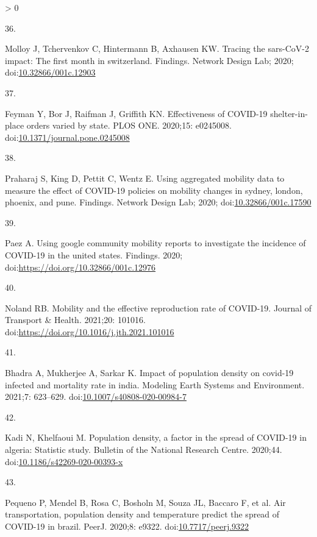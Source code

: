 \documentclass[10pt,letterpaper]{article}
\newlength{\csllabelwidth}
\newlength{\cslhangindent}
\newenvironment{CSLReferences}[3] %
 {%
  \setlength{\parindent}{0pt}
  \ifodd #1 \everypar{\setlength{\hangindent}{\cslhangindent}}\ignorespaces\fi
  \ifnum #2 > 0
  \setlength{\parskip}{#2\baselineskip}
  \fi
 }%
 {}
\newcommand{\CSLLeftMargin}[1]{\parbox[t]{\csllabelwidth}{#1}}
\newcommand{\CSLRightInline}[1]{\parbox[t]{\linewidth - \csllabelwidth}{#1}}
\begin{document}
\begin{CSLReferences}{0}{0}
\leavevmode\hypertarget{ref-Molloy2020Tracing}{}%
\CSLLeftMargin{36. }
\CSLRightInline{Molloy J, Tchervenkov C, Hintermann B, Axhausen KW.
Tracing the sars-CoV-2 impact: The first month in switzerland. Findings.
Network Design Lab; 2020;
doi:\href{https://doi.org/10.32866/001c.12903}{10.32866/001c.12903}}

\leavevmode\hypertarget{ref-Feyman2020effectiveness}{}%
\CSLLeftMargin{37. }
\CSLRightInline{Feyman Y, Bor J, Raifman J, Griffith KN. Effectiveness
of COVID-19 shelter-in-place orders varied by state. PLOS ONE. 2020;15:
e0245008.
doi:\href{https://doi.org/10.1371/journal.pone.0245008}{10.1371/journal.pone.0245008}}

\leavevmode\hypertarget{ref-Praharaj2020Using}{}%
\CSLLeftMargin{38. }
\CSLRightInline{Praharaj S, King D, Pettit C, Wentz E. Using aggregated
mobility data to measure the effect of COVID-19 policies on mobility
changes in sydney, london, phoenix, and pune. Findings. Network Design
Lab; 2020;
doi:\href{https://doi.org/10.32866/001c.17590}{10.32866/001c.17590}}

\leavevmode\hypertarget{ref-Paez2020using}{}%
\CSLLeftMargin{39. }
\CSLRightInline{Paez A. Using google community mobility reports to
investigate the incidence of COVID-19 in the united states. Findings.
2020; doi:\url{https://doi.org/10.32866/001c.12976}}

\leavevmode\hypertarget{ref-Noland2021mobility}{}%
\CSLLeftMargin{40. }
\CSLRightInline{Noland RB. Mobility and the effective reproduction rate
of COVID-19. Journal of Transport \& Health. 2021;20: 101016.
doi:\url{https://doi.org/10.1016/j.jth.2021.101016}}

\leavevmode\hypertarget{ref-Bhadra2021impact}{}%
\CSLLeftMargin{41. }
\CSLRightInline{Bhadra A, Mukherjee A, Sarkar K. Impact of population
density on covid-19 infected and mortality rate in india. Modeling Earth
Systems and Environment. 2021;7: 623--629.
doi:\href{https://doi.org/10.1007/s40808-020-00984-7}{10.1007/s40808-020-00984-7}}

\leavevmode\hypertarget{ref-Kadi2020population}{}%
\CSLLeftMargin{42. }
\CSLRightInline{Kadi N, Khelfaoui M. Population density, a factor in the
spread of COVID-19 in algeria: Statistic study. Bulletin of the National
Research Centre. 2020;44.
doi:\href{https://doi.org/10.1186/s42269-020-00393-x}{10.1186/s42269-020-00393-x}}

\leavevmode\hypertarget{ref-Pequeno2020air}{}%
\CSLLeftMargin{43. }
\CSLRightInline{Pequeno P, Mendel B, Rosa C, Bosholn M, Souza JL,
Baccaro F, et al. Air transportation, population density and temperature
predict the spread of COVID-19 in brazil. PeerJ. 2020;8: e9322.
doi:\href{https://doi.org/10.7717/peerj.9322}{10.7717/peerj.9322}}


\end{CSLReferences}
\end{document}
